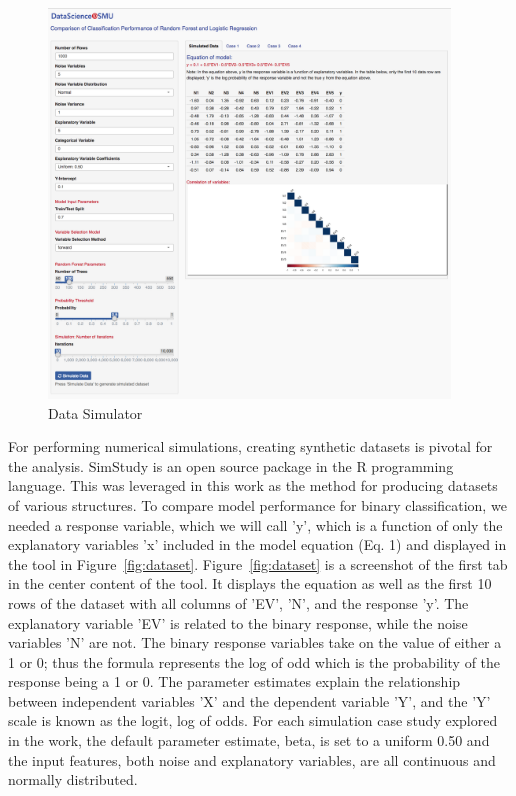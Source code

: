 \documentclass{llncs}
\begin{document}
\begin{figure}
\centering
\includegraphics[width=0.95\textwidth]{full-tool.png}
\caption{Data Simulator}
\label{fig:rshiny}
\end{figure}


\noindent 
For performing numerical simulations, creating synthetic datasets is pivotal for the analysis. SimStudy is an open source package in the R programming language. This was leveraged in this work as the method for producing datasets of various structures. To compare model performance for binary classification, we needed a response variable, which we will call 'y', which is a function of only the explanatory variables 'x' included in the model equation (Eq. 1) and displayed in the tool in Figure~\ref{fig:dataset}.  Figure~\ref{fig:dataset} is a screenshot of the first tab in the center content of the tool.  It displays the equation as well as the first 10 rows of the dataset with all columns of 'EV', 'N', and the response 'y'. The explanatory variable 'EV' is related to the binary response, while the noise variables 'N' are not. The binary response variables take on the value of either a 1 or 0; thus the formula represents the log of odd which is the probability of the response being a 1 or 0. The parameter estimates explain the relationship between independent variables 'X' and the dependent variable 'Y', and the 'Y' scale is known as the logit, log of odds. For each simulation case study explored in the work, the default parameter estimate, beta, is set to a uniform 0.50 and the input features, both noise and explanatory variables, are all continuous and normally distributed. 
\end{document}
